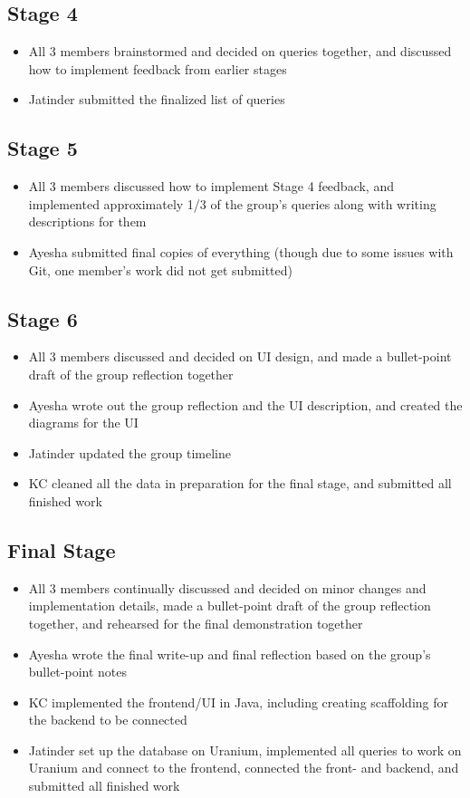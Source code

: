 \documentclass[]{article}
\begin{document}
\subsection{Stage 4}
\begin{itemize}
    \item All 3 members brainstormed and decided on queries together, and discussed how to implement feedback from earlier stages
    \item Jatinder submitted the finalized list of queries
\end{itemize}

\subsection{Stage 5}
\begin{itemize}
    \item All 3 members discussed how to implement Stage 4 feedback, and implemented approximately 1/3 of the group's queries along with writing descriptions for them
    \item Ayesha submitted final copies of everything (though due to some issues with Git, one member's work did not get submitted)
\end{itemize}

\subsection{Stage 6}
\begin{itemize}
    \item All 3 members discussed and decided on UI design, and made a bullet-point draft of the group reflection together
    \item Ayesha wrote out the group reflection and the UI description, and created the diagrams for the UI
    \item Jatinder updated the group timeline 
    \item KC cleaned all the data in preparation for the final stage, and submitted all finished work
\end{itemize}

\subsection{Final Stage}
\begin{itemize}
    \item All 3 members continually discussed and decided on minor changes and implementation details, made a bullet-point draft of the group reflection together, and rehearsed for the final demonstration together
    \item Ayesha wrote the final write-up and final reflection based on the group's bullet-point notes
    \item KC implemented the frontend/UI in Java, including creating scaffolding for the backend to be connected
    \item Jatinder set up the database on Uranium, implemented all queries to work on Uranium and connect to the frontend, connected the front- and backend, and submitted all finished work
\end{itemize}
\end{document}
